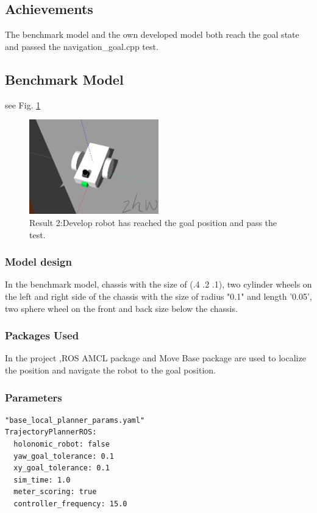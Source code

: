 \documentclass[10pt,journal,compsoc]{IEEEtran}
\begin{document}
\subsection{Achievements}
The benchmark model and the own developed model both reach the goal state and passed the navigation\_goal.cpp test.

\subsection{Benchmark Model}
see Fig. \ref{fig:Benchmark}

\begin{figure}
\centering
\includegraphics[width=0.5\textwidth]{r8.png}
\caption{\label{fig:Benchmark}Result 2:Develop robot has reached the goal position and pass the test.}
\end{figure}

\subsubsection{Model design}
In the benchmark model, chassis with the size of (.4 .2 .1), two cylinder wheels on the left and right side of the chassis with the size of radius "0.1" and length '0.05', two sphere wheel on the front and back size below the chassis.


\subsubsection{Packages Used}
In the project ,ROS AMCL package and Move Base package are used to localize the position and navigate the robot to the goal position.

\subsubsection{Parameters}


\begin{lstlisting}
"base_local_planner_params.yaml"
TrajectoryPlannerROS:
  holonomic_robot: false
  yaw_goal_tolerance: 0.1
  xy_goal_tolerance: 0.1
  sim_time: 1.0
  meter_scoring: true 
  controller_frequency: 15.0
\end{lstlisting}
\end{document}

